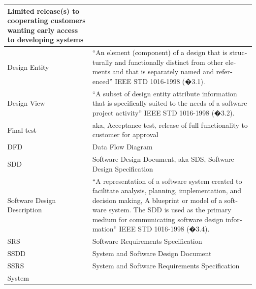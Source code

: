 \documentclass[twoside,letterpaper]{article}
\begin{document}
\begin{flushleft}
\begin{supertabular}{|m{1.3587599in}|m{5.00806in}|}
\color{black} Limited release(s) to cooperating
customers wanting early access to developing systems\\\hline
{}\color{black} Design Entity &
\color{black}
\foreignlanguage{english}{{\textquotedblleft}}\foreignlanguage{english}{An
element (component) of a design that is structurally and functionally
distinct from other elements and that is separately named and
referenced{\textquotedblright} IEEE STD 1016-1998 (�3.1).}\\\hline
{}\color{black} Design View &
\color{black}
\foreignlanguage{english}{{\textquotedblleft}}\foreignlanguage{english}{A
subset of design entity attribute information that is specifically
suited to the needs of a software project activity{\textquotedblright}
IEEE STD 1016-1998 (�3.2).}\\\hline
{}\color{black} Final test &
\color{black} aka, Acceptance test, release of
full functionality to customer for approval\\\hline
{}\color{black} DFD &
\color{black} Data Flow Diagram\\\hline
{}\color{black} SDD &
\color{black} Software Design Document, aka SDS,
Software Design Specification\\\hline
{}\color{black} Software Design Description &
\color{black}
\foreignlanguage{english}{{\textquotedblleft}}\foreignlanguage{english}{A
representation of a software system created to facilitate analysis,
planning, implementation, and decision making, A blueprint or model of
a software system. The SDD is used as the primary medium for
communicating software }\foreignlanguage{english}{design
information{\textquotedblright} IEEE STD 1016-1998 (�3.4).}\\\hline
{}\color{black} SRS &
\color{black} Software Requirements
Specification\\\hline
{}\color{black} SSDD &
\color{black} System and Software Design
Document\\\hline
{}\color{black} SSRS &
\color{black} System and Software Requirements
Specification\\\hline
{}\color{black} System &

\end{supertabular}
\end{flushleft}
\end{document}
